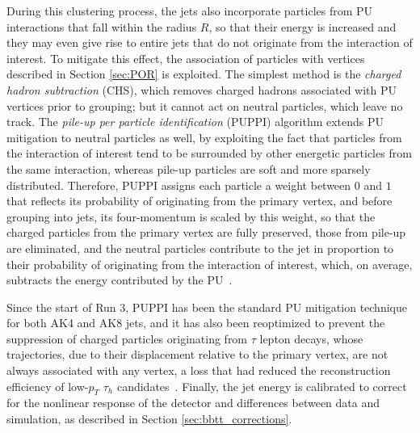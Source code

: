 During this clustering process, the jets also incorporate particles from PU interactions that fall within the radius $R$, so that their energy is increased and they may even give rise to entire jets that do not originate from the interaction of interest. To mitigate this effect, the association of particles with vertices described in Section \ref{sec:POR} is exploited. The simplest method is the \textit{charged hadron subtraction} (CHS), which removes charged hadrons associated with PU vertices prior to grouping; but it cannot act on neutral particles, which leave no track. The \textit{pile-up per particle identification} (PUPPI) algorithm extends PU mitigation to neutral particles as well, by exploiting the fact that particles from the interaction of interest tend to be surrounded by other energetic particles from the same interaction, whereas pile-up particles are soft and more sparsely distributed. Therefore, PUPPI assigns each particle a weight between $0$ and $1$ that reflects its probability of originating from the primary vertex, and before grouping into jets, its four-momentum is scaled by this weight, so that the charged particles from the primary vertex are fully preserved, those from pile-up are eliminated, and the neutral particles contribute to the jet in proportion to their probability of originating from the interaction of interest, which, on average, subtracts the energy contributed by the PU~\cite{Bertolini:2014bba,CMS:2020ebo}.


Since the start of Run 3, PUPPI has been the standard PU mitigation technique for both AK4 and AK8 jets, and it has also been reoptimized to prevent the suppression of charged particles originating from $\tau$ lepton decays, whose trajectories, due to their displacement relative to the primary vertex, are not always associated with any vertex, a loss that had reduced the reconstruction efficiency of low-$p_T$ $\tau_h$ candidates~\cite{CMS-DP-2024-043}. Finally, the jet energy is calibrated to correct for the nonlinear response of the detector and differences between data and simulation, as described in Section \ref{sec:bbtt_corrections}.\medskip


